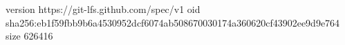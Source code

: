 version https://git-lfs.github.com/spec/v1
oid sha256:eb1f59fbb9b6a4530952dcf6074ab508670030174a360620cf43902ee9d9e764
size 626416
